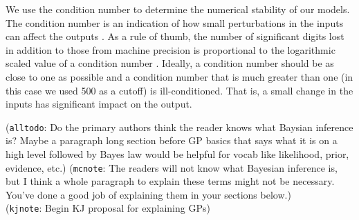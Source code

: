 \documentclass[journal=jacsat,manuscript=article]{achemso}
\newcommand{\kjnote}[1]{{\color{Blue} (\texttt{kjnote}: #1)}}
\newcommand{\alltodo}[1]{{\color{Cyan} (\texttt{alltodo}: #1)}}
\newcommand{\mcnote}[1]{{\color{Plum} (\texttt{mcnote}: #1)}}
\begin{document}
We use the condition number to determine the numerical stability of our models. The condition number is an indication of how small perturbations in the inputs can affect the outputs \cite{Foster2009}. As a rule of thumb, the number of significant digits lost in addition to those from machine precision is proportional to the logarithmic scaled value of a condition number \cite{NumMathComput}. Ideally, a condition number should be as close to one as possible and a condition number that is much greater than one (in this case we used 500 as a cutoff) is ill-conditioned. That is, a small change in the inputs has significant impact on the output.

\alltodo{Do the primary authors think the reader knows what Baysian inference is? Maybe a paragraph long section before GP basics that says what it is on a high level followed by Bayes law would be helpful for vocab like likelihood, prior, evidence, etc.}
\mcnote{The readers will not know what Bayesian inference is, but I think a whole paragraph to explain these terms might not be necessary. You've done a good job of explaining them in your sections below.}
\\
\kjnote{Begin KJ proposal for explaining GPs}
\end{document}
